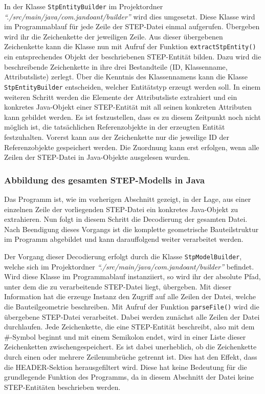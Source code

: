 In der Klasse \verb|StpEntityBuilder| im Projektordner \textit{"`./src/main/java/com.jandoant/builder"'} wird dies umgesetzt. Diese Klasse wird im Programmablauf für jede Zeile der STEP-Datei einmal aufgerufen. Übergeben wird ihr die Zeichenkette der jeweiligen Zeile. Aus dieser übergebenen Zeichenkette kann die Klasse nun mit Aufruf der Funktion \verb|extractStpEntity()| ein entsprechendes Objekt der beschriebenen STEP-Entität bilden. 
Dazu wird die beschreibende Zeichenkette in ihre drei Bestandteile (ID, Klassenname, Attributsliste) zerlegt. Über die Kenntnis des Klassennamens kann die Klasse \verb|StpEntityBuilder| entscheiden, welcher Entitätstyp erzeugt werden soll. In einem weiteren Schritt werden die Elemente der Attributsliste extrahiert und ein konkretes Java-Objekt einer STEP-Entität mit all seinen konkreten Attributen kann gebildet werden. Es ist festzustellen, dass es zu diesem Zeitpunkt noch nicht möglich ist, die tatsächlichen Referenzobjekte in der erzeugten Entität festzuhalten. Vorerst kann aus der Zeichenkette nur die jeweilige ID der Referenzobjekte gespeichert werden. Die Zuordnung kann erst erfolgen, wenn alle Zeilen der STEP-Datei in Java-Objekte ausgelesen wurden.

\subsubsection{Abbildung des gesamten STEP-Modells in Java} 

Das Programm ist, wie im vorherigen Abschnitt gezeigt, in der Lage, aus einer einzelnen Zeile der vorliegenden STEP-Datei ein konkretes Java-Objekt zu extrahieren. Nun folgt in diesem Schritt die Decodierung der gesamten Datei. Nach Beendigung dieses Vorgangs ist die komplette geometrische Bauteilstruktur im Programm abgebildet und kann darauffolgend weiter verarbeitet werden.

Der Vorgang dieser Decodierung erfolgt durch die Klasse \verb|StpModelBuilder|, welche sich im Projektordner \textit{"`./src/main/java/com.jandoant/builder"'} befindet. 
Wird diese Klasse im Pro\-gramm\-ab\-lauf instanziiert, so wird ihr der absolute Pfad, unter dem die zu verarbeitende STEP-Datei liegt, übergeben. Mit dieser Information hat die erzeuge Instanz den Zugriff auf alle Zeilen der Datei, welche die Bauteilgeometrie beschreiben.
Mit Aufruf der Funktion \verb|parseFile()| wird die übergebene STEP-Datei verarbeitet. Dabei werden zunächst alle Zeilen der Datei durchlaufen. Jede Zeichenkette, die eine STEP-Entität beschreibt, also mit dem \#-Symbol beginnt und mit einem Semikolon endet, wird in einer Liste dieser Zeichenketten zwischengespeichert. Es ist dabei unerheblich, ob die Zeichenkette durch einen oder mehrere Zeilenumbrüche getrennt ist. Dies hat den Effekt, dass die HEADER-Sektion herausgefiltert wird. Diese hat keine Bedeutung für die grundlegende Funktion des Programms, da in diesem Abschnitt der Datei keine STEP-Entitäten beschrieben werden.


